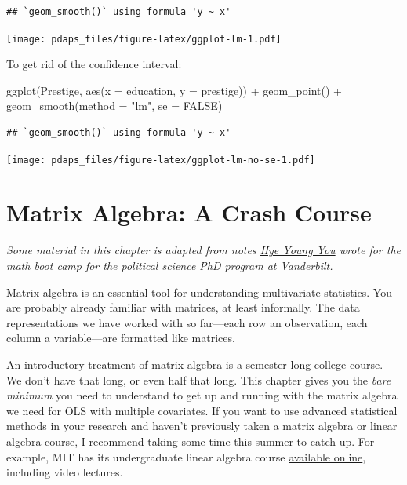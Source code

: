 \documentclass[
  12pt,
  oneside,openany]{book}
\newenvironment{Shaded}{\begin{snugshade}}{\end{snugshade}}
\newcommand{\AttributeTok}[1]{\textcolor[rgb]{0.77,0.63,0.00}{#1}}
\newcommand{\ConstantTok}[1]{\textcolor[rgb]{0.00,0.00,0.00}{#1}}
\newcommand{\FunctionTok}[1]{\textcolor[rgb]{0.00,0.00,0.00}{#1}}
\newcommand{\NormalTok}[1]{#1}
\newcommand{\SpecialCharTok}[1]{\textcolor[rgb]{0.00,0.00,0.00}{#1}}
\newcommand{\StringTok}[1]{\textcolor[rgb]{0.31,0.60,0.02}{#1}}
\begin{document}
\begin{verbatim}
## `geom_smooth()` using formula 'y ~ x'
\end{verbatim}

\texttt{[image: pdaps\_files/figure-latex/ggplot-lm-1.pdf]}

To get rid of the confidence interval:

\begin{Shaded}
\begin{Highlighting}[]
\FunctionTok{ggplot}\NormalTok{(Prestige, }\FunctionTok{aes}\NormalTok{(}\AttributeTok{x =}\NormalTok{ education, }\AttributeTok{y =}\NormalTok{ prestige)) }\SpecialCharTok{+}
  \FunctionTok{geom\_point}\NormalTok{() }\SpecialCharTok{+}
  \FunctionTok{geom\_smooth}\NormalTok{(}\AttributeTok{method =} \StringTok{"lm"}\NormalTok{, }\AttributeTok{se =} \ConstantTok{FALSE}\NormalTok{)}
\end{Highlighting}
\end{Shaded}

\begin{verbatim}
## `geom_smooth()` using formula 'y ~ x'
\end{verbatim}

\texttt{[image: pdaps\_files/figure-latex/ggplot-lm-no-se-1.pdf]}

\hypertarget{matrix}{%
\chapter{Matrix Algebra: A Crash Course}\label{matrix}}

\emph{Some material in this chapter is adapted from notes \href{https://hyeyoungyou.com}{Hye Young You} wrote for the math boot camp for the political science PhD program at Vanderbilt.}

Matrix algebra is an essential tool for understanding multivariate statistics. You are probably already familiar with matrices, at least informally. The data representations we have worked with so far---each row an observation, each column a variable---are formatted like matrices.

An introductory treatment of matrix algebra is a semester-long college course. We don't have that long, or even half that long. This chapter gives you the \emph{bare minimum} you need to understand to get up and running with the matrix algebra we need for OLS with multiple covariates. If you want to use advanced statistical methods in your research and haven't previously taken a matrix algebra or linear algebra course, I recommend taking some time this summer to catch up. For example, MIT has its undergraduate linear algebra course \href{https://ocw.mit.edu/courses/mathematics/18-06-linear-algebra-spring-2010/index.htm}{available online}, including video lectures.
\end{document}

